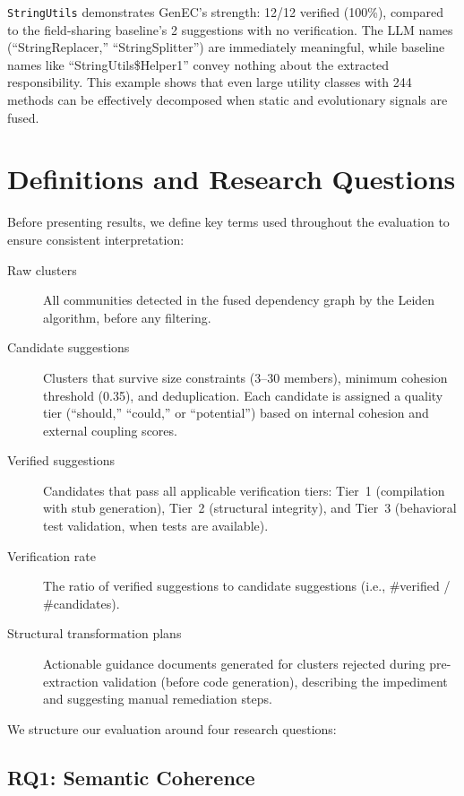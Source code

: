 \documentclass[sigconf]{acmart}
\begin{document}
\texttt{StringUtils} demonstrates GenEC's strength: 12/12 verified (100\%),
compared to the field-sharing baseline's 2 suggestions with no verification.
The LLM names (``StringReplacer,'' ``StringSplitter'') are immediately
meaningful, while baseline names like ``StringUtils\$Helper1'' convey nothing
about the extracted responsibility. This example shows that even large utility
classes with 244 methods can be effectively decomposed when static and
evolutionary signals are fused.

\section{Definitions and Research Questions}
\label{sec:rqs}

Before presenting results, we define key terms used throughout the evaluation
to ensure consistent interpretation:

\begin{description}
  \item[Raw clusters] All communities detected in the fused dependency graph by
    the Leiden algorithm, before any filtering.
  \item[Candidate suggestions] Clusters that survive size constraints (3--30
    members), minimum cohesion threshold (0.35), and deduplication. Each
    candidate is assigned a quality tier (``should,'' ``could,'' or
    ``potential'') based on internal cohesion and external coupling scores.
  \item[Verified suggestions] Candidates that pass all applicable verification
    tiers: Tier~1 (compilation with stub generation), Tier~2 (structural
    integrity), and Tier~3 (behavioral test validation, when tests are
    available).
  \item[Verification rate] The ratio of verified suggestions to candidate
    suggestions (i.e., \#verified / \#candidates).
  \item[Structural transformation plans] Actionable guidance documents generated
    for clusters rejected during pre-extraction validation (before code
    generation), describing the impediment and suggesting manual remediation
    steps.
\end{description}

We structure our evaluation around four research questions:

\subsection{RQ1: Semantic Coherence}
\end{document}
